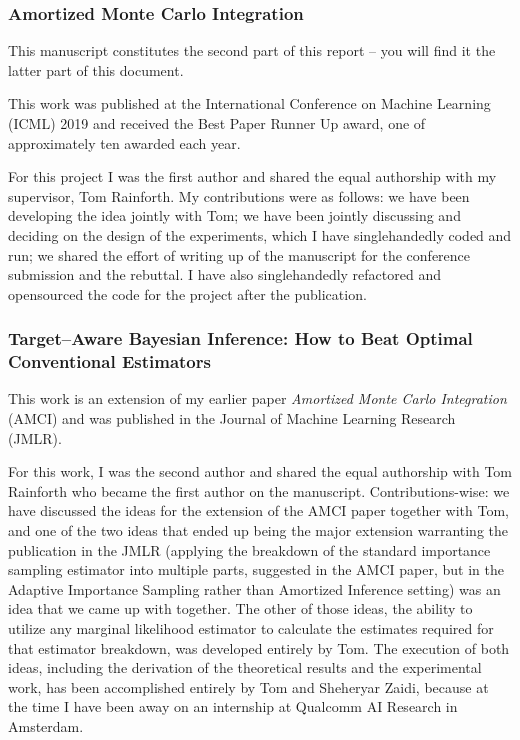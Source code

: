 \documentclass[12pt]{article}
\begin{document}
\subsubsection{Amortized Monte Carlo Integration}%

This manuscript constitutes the second part of this report -- you will find it the latter part of this document.

This work was published at the International Conference on Machine Learning (ICML) 2019 and received the Best Paper Runner Up award, one of approximately ten awarded each year.

For this project I was the first author and shared the equal authorship with my supervisor, Tom Rainforth.
My contributions were as follows: we have been developing the idea jointly with Tom; 
we have been jointly discussing and deciding on the design of the experiments, which I have singlehandedly coded and run; 
we shared the effort of writing up of the manuscript for the conference submission and the rebuttal.
I have also singlehandedly refactored and opensourced the code for the project after the publication.

\subsubsection{Target–Aware Bayesian Inference: How to Beat Optimal Conventional Estimators}%

This work is an extension of my earlier paper \emph{Amortized Monte Carlo Integration} (AMCI)
and
was published in the Journal of Machine Learning Research (JMLR).

For this work, I was the second author and shared the equal authorship with Tom Rainforth who became the first author on the manuscript.
Contributions-wise: we have discussed the ideas for the extension of the AMCI paper together with Tom, 
and one of the two ideas that ended up being the major extension warranting the publication in the JMLR
(applying the breakdown of the standard importance sampling estimator into multiple parts, suggested in the AMCI paper, but in the Adaptive Importance Sampling rather than Amortized Inference setting)
was an idea that we came up with together.
The other of those ideas, the ability to utilize any marginal likelihood estimator to calculate the estimates required for that estimator breakdown, was developed entirely by Tom. 
The execution of both ideas, including the derivation of the theoretical results and the experimental work, has been accomplished entirely by Tom and Sheheryar Zaidi, 
because at the time I have been away on an internship at Qualcomm AI Research in Amsterdam.
\end{document}
